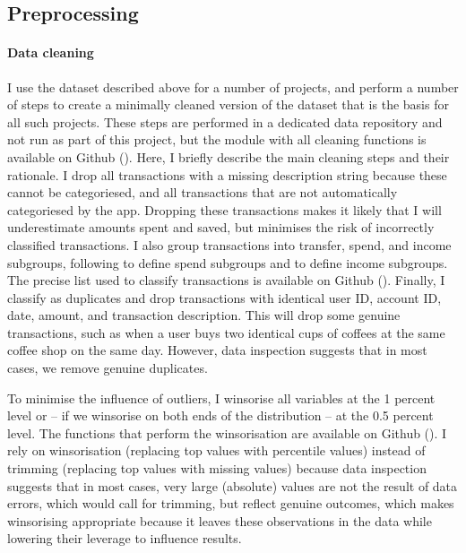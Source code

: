 \subsection{Preprocessing}%
\label{sub:preprocessing}

\paragraph{Data cleaning}%
\label{par:data_cleaning}

I use the dataset described above for a number of projects, and perform a
number of steps to create a minimally cleaned version of the dataset that is
the basis for all such projects. These steps are performed in a dedicated data
repository and not run as part of this project, but the module with all
cleaning functions is available on Github 
(\href{https:/egithub.com/fabiangunzinger/mdb_eval/blob/f51e49c95c5884d2dc417be23921a8acd85aec9d/src/data/clean.py}{\faGithub}).
Here, I briefly describe the main cleaning steps and their rationale. I drop
all transactions with a missing description string because these cannot be
categoriesed, and all transactions that are not automatically categoriesed by
the app. Dropping these transactions makes it likely that I will underestimate
amounts spent and saved, but minimises the risk of incorrectly classified
transactions. I also group transactions into transfer, spend, and income
subgroups, following \citet{muggleton2020evidence} to define spend subgroups
and \citet{hacioglu2021distributional} to define income subgroups. The precise
list used to classify transactions is available on Github
(\href{https://github.com/fabiangunzinger/mdb_eval/blob/92af366d4c4052cc7a7f78a6178086de8ecdfb75/src/data/txn_classifications.py}{\faGithub}).
Finally, I classify as duplicates and drop transactions with identical user ID,
account ID, date, amount, and transaction description. This will drop some
genuine transactions, such as when a user buys two identical cups of coffees at
the same coffee shop on the same day. However, data inspection suggests that in
most cases, we remove genuine duplicates.

To minimise the influence of outliers, I winsorise all variables at the 1
percent level or -- if we winsorise on both ends of the distribution -- at the
0.5 percent level. The functions that perform the winsorisation are available
on Github
(\href{https://github.com/fabiangunzinger/mdb_eval/blob/d04fe186bb5cca884af2b7c1c7ad429674ef701d/src/data/transformers.py}{\faGithub}).
I rely on winsorisation (replacing top values with percentile values) instead
of trimming (replacing top values with missing values) because data inspection
suggests that in most cases, very large (absolute) values are not the result of
data errors, which would call for trimming, but reflect genuine outcomes,
which makes winsorising appropriate because it leaves these observations in the
data while lowering their leverage to influence results.


